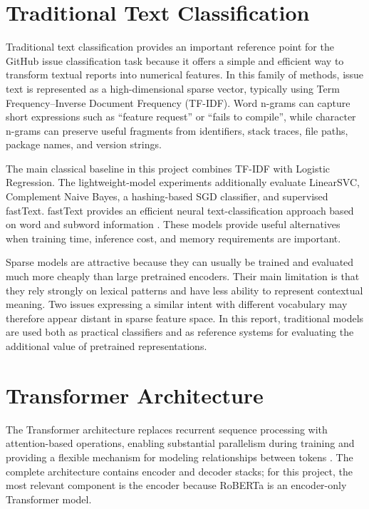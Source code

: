 \section{Traditional Text Classification}
Traditional text classification provides an important reference point for the GitHub issue classification task because it offers a simple and efficient way to transform textual reports into numerical features. In this family of methods, issue text is represented as a high-dimensional sparse vector, typically using Term Frequency--Inverse Document Frequency (TF-IDF). Word n-grams can capture short expressions such as ``feature request'' or ``fails to compile'', while character n-grams can preserve useful fragments from identifiers, stack traces, file paths, package names, and version strings.

The main classical baseline in this project combines TF-IDF with Logistic Regression. The lightweight-model experiments additionally evaluate LinearSVC, Complement Naive Bayes, a hashing-based SGD classifier, and supervised fastText. fastText provides an efficient neural text-classification approach based on word and subword information \cite{joulin2017bag}. These models provide useful alternatives when training time, inference cost, and memory requirements are important.

Sparse models are attractive because they can usually be trained and evaluated much more cheaply than large pretrained encoders. Their main limitation is that they rely strongly on lexical patterns and have less ability to represent contextual meaning. Two issues expressing a similar intent with different vocabulary may therefore appear distant in sparse feature space. In this report, traditional models are used both as practical classifiers and as reference systems for evaluating the additional value of pretrained representations.

\section{Transformer Architecture}
The Transformer architecture replaces recurrent sequence processing with attention-based operations, enabling substantial parallelism during training and providing a flexible mechanism for modeling relationships between tokens \cite{vaswani2017attention}. The complete architecture contains encoder and decoder stacks; for this project, the most relevant component is the encoder because RoBERTa is an encoder-only Transformer model.

